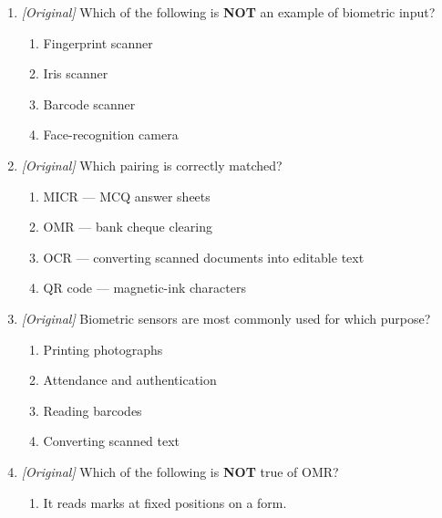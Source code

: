 \begin{enumerate}[label=\textbf{Q\arabic*.}, leftmargin=*]
\begin{enumerate}[label=\Roman*.]
    \item OMR is used to read marks on MCQ answer sheets.
    \item MICR uses magnetic ink and is used for bank cheques.
  \end{enumerate}
  \begin{enumerate}[label=\Alph*.]
    \item I and II only
    \item II and III only
    \item I and III only
    \item I, II, and III
  \end{enumerate}
\item \textit{[Original]} Which of the following is \textbf{NOT} an example
  of biometric input?
  \begin{enumerate}[label=\Alph*.]
    \item Fingerprint scanner
    \item Iris scanner
    \item Barcode scanner
    \item Face-recognition camera
  \end{enumerate}
\item \textit{[Original]} Which pairing is correctly matched?
  \begin{enumerate}[label=\Alph*.]
    \item MICR --- MCQ answer sheets
    \item OMR --- bank cheque clearing
    \item OCR --- converting scanned documents into editable text
    \item QR code --- magnetic-ink characters
  \end{enumerate}
\item \textit{[Original]} Biometric sensors are most commonly used for which
  purpose?
  \begin{enumerate}[label=\Alph*.]
    \item Printing photographs
    \item Attendance and authentication
    \item Reading barcodes
    \item Converting scanned text
  \end{enumerate}
\item \textit{[Original]} Which of the following is \textbf{NOT} true of
  OMR?
  \begin{enumerate}[label=\Alph*.]
    \item It reads marks at fixed positions on a form.

\end{enumerate}
\end{enumerate}
